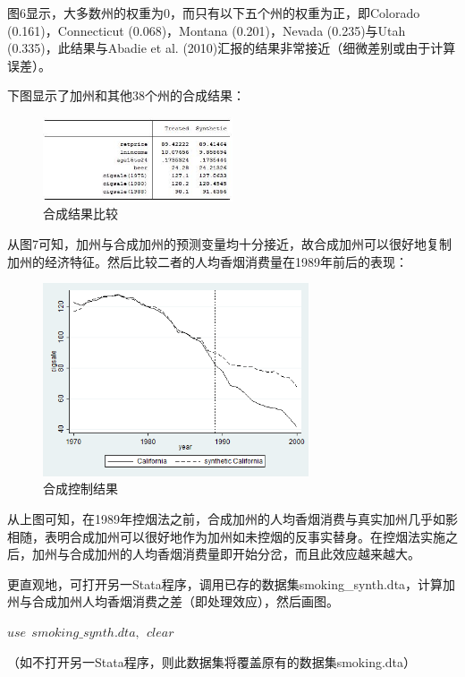\documentclass[cn,10pt,math=newtx,citestyle=gb7714-2015,bibstyle=gb7714-2015]{elegantbook}
\begin{document}
	图6显示，大多数州的权重为0，而只有以下五个州的权重为正，即Colorado (0.161)，Connecticut (0.068)，Montana (0.201)，Nevada (0.235)与Utah (0.335)，此结果与Abadie et al. (2010)汇报的结果非常接近（细微差别或由于计算误差）。
	
	下图显示了加州和其他38个州的合成结果：
	
	\begin{figure}[htbp]
		\centering
		\includegraphics[width=0.5\textwidth]{sys.jpg}
		\caption{合成结果比较}\label{fig:digit}
	\end{figure}
	
	从图7可知，加州与合成加州的预测变量均十分接近，故合成加州可以很好地复制加州的经济特征。然后比较二者的人均香烟消费量在1989年前后的表现：
	
	\begin{figure}[htbp]
		\centering
		\includegraphics[width=0.7\textwidth]{synth.png}
		\caption{合成控制结果}\label{fig:digit}
	\end{figure}
	
	从上图可知，在1989年控烟法之前，合成加州的人均香烟消费与真实加州几乎如影相随，表明合成加州可以很好地作为加州如未控烟的反事实替身。在控烟法实施之后，加州与合成加州的人均香烟消费量即开始分岔，而且此效应越来越大。
	
	更直观地，可打开另一Stata程序，调用已存的数据集smoking\_synth.dta，计算加州与合成加州人均香烟消费之差（即处理效应），然后画图。
	
	\textbf{$use~~smoking\_synth.dta,~~clear$}
	
	（如不打开另一Stata程序，则此数据集将覆盖原有的数据集smoking.dta）
	
\end{document}
